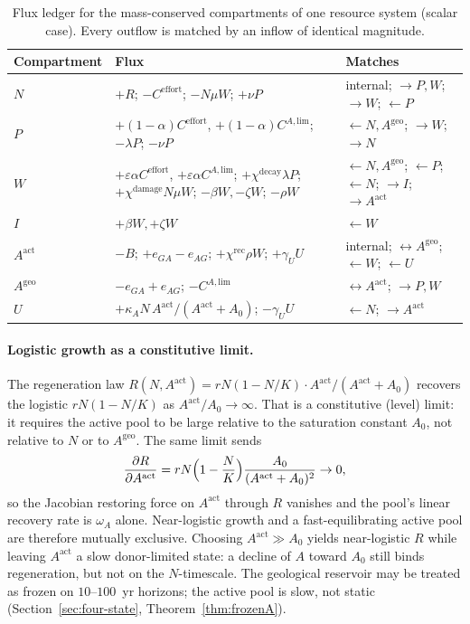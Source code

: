 \documentclass[11pt]{article}
\theoremstyle{definition}
\begin{document}
\begin{table}[t]
\centering\small
\caption{Flux ledger for the mass-conserved compartments of one resource system (scalar case). Every outflow is matched by an inflow of identical magnitude.}
\label{tab:ledger}
\begin{tabular}{llp{4.6cm}}
\toprule
\textbf{Compartment} & \textbf{Flux} & \textbf{Matches} \\
\midrule
$N$ & $+R$; $-C^{\mathrm{effort}}$; $-N\mu W$; $+\nu P$ & internal; $\to P,W$; $\to W$; $\leftarrow P$ \\
$P$ & $+(1-\alpha)C^{\mathrm{effort}}$, $+(1-\alpha)C^{A,\mathrm{lim}}$; $-\lambda P$; $-\nu P$ & $\leftarrow N,A^{\mathrm{geo}}$; $\to W$; $\to N$ \\
$W$ & $+\varepsilon\alpha C^{\mathrm{effort}}$, $+\varepsilon\alpha C^{A,\mathrm{lim}}$; $+\chi^{\mathrm{decay}}\lambda P$; $+\chi^{\mathrm{damage}}N\mu W$; $-\beta W,-\zeta W$; $-\rho W$ & $\leftarrow N,A^{\mathrm{geo}}$; $\leftarrow P$; $\leftarrow N$; $\to I$; $\to A^{\mathrm{act}}$ \\
$I$ & $+\beta W,+\zeta W$ & $\leftarrow W$ \\
$A^{\mathrm{act}}$ & $-B$; $+e_{GA}-e_{AG}$; $+\chi^{\mathrm{rec}}\rho W$; $+\gamma_U U$ & internal; $\leftrightarrow A^{\mathrm{geo}}$; $\leftarrow W$; $\leftarrow U$ \\
$A^{\mathrm{geo}}$ & $-e_{GA}+e_{AG}$; $-C^{A,\mathrm{lim}}$ & $\leftrightarrow A^{\mathrm{act}}$; $\to P,W$ \\
$U$ & $+\kappa_A N\,A^{\mathrm{act}}/(A^{\mathrm{act}}+A_0)$; $-\gamma_U U$ & $\leftarrow N$; $\to A^{\mathrm{act}}$ \\
\bottomrule
\end{tabular}
\end{table}

\paragraph{Logistic growth as a constitutive limit.}
The regeneration law $R(N,A^{\mathrm{act}})=rN(1-N/K)\cdot A^{\mathrm{act}}/(A^{\mathrm{act}}+A_0)$ recovers the logistic $rN(1-N/K)$ as $A^{\mathrm{act}}/A_0\to\infty$. That is a constitutive (level) limit: it requires the active pool to be large relative to the saturation constant $A_0$, not relative to $N$ or to $A^{\mathrm{geo}}$. The same limit sends
\[
\frac{\partial R}{\partial A^{\mathrm{act}}}=rN\Bigl(1-\frac NK\Bigr)\frac{A_0}{(A^{\mathrm{act}}+A_0)^2}\to 0,
\]
so the Jacobian restoring force on $A^{\mathrm{act}}$ through $R$ vanishes and the pool's linear recovery rate is $\omega_A$ alone. Near-logistic growth and a fast-equilibrating active pool are therefore mutually exclusive. Choosing $A^{\mathrm{act}}\gg A_0$ yields near-logistic $R$ while leaving $A^{\mathrm{act}}$ a slow donor-limited state: a decline of $A$ toward $A_0$ still binds regeneration, but not on the $N$-timescale. The geological reservoir may be treated as frozen on $10$--$100$~yr horizons; the active pool is slow, not static (Section~\ref{sec:four-state}, Theorem~\ref{thm:frozenA}).
\end{document}
